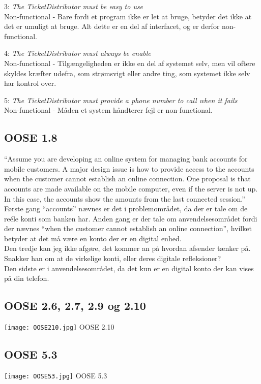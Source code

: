 \documentclass{article}
\begin{document}
3: \textit{The TicketDistributor must be easy to use} \\
Non-functional - Bare fordi et program ikke er let at bruge, betyder det ikke at det er umuligt at bruge. Alt dette er en del af interfacet, og er derfor non-functional.

4: \textit{The TicketDistributor must always be enable} \\
Non-functional - Tilgængeligheden er ikke en del af systemet selv, men vil oftere skyldes kræfter udefra, som strømsvigt eller andre ting, som systemet ikke selv har kontrol over.

5: \textit{The TicketDistributor must provide a phone number to call when it fails} \\
Non-functional - Måden et system håndterer fejl er non-functional.

\subsection{OOSE 1.8}
“Assume you are developing an online system for managing bank accounts for
mobile customers. A major design issue is how to provide access to the accounts
when the customer cannot establish an online connection. One proposal is that
accounts are made available on the mobile computer, even if the server is not up. In
this case, the accounts show the amounts from the last connected session.”
\\
Første gang “accounts” nævnes er det i problemområdet, da der er tale om de reéle konti som banken har.
Anden gang er der tale om anvendelsesområdet fordi der nævnes “when the customer cannot establish an online connection”, hvilket betyder at det må være en konto der er en digital enhed.
\\
Den tredje kan jeg ikke afgøre, det kommer an på hvordan afsender tænker på. Snakker han om at de virkelige konti, eller deres digitale refleksioner? \\
Den sidste er i anvendelsesområdet, da det kun er en digital konto der kan vises på din telefon.

\subsection{OOSE 2.6, 2.7, 2.9 og 2.10}
\texttt{[image: OOSE210.jpg]} {\footnotesize OOSE 2.10}

\subsection{OOSE 5.3}
\texttt{[image: OOSE53.jpg]} {\footnotesize OOSE 5.3}
\end{document}
